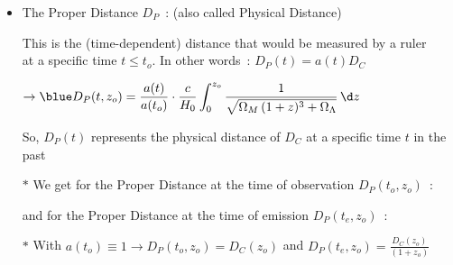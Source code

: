 \Tr
\onecolumn
\begin{itemize}
\item The {\blue Proper Distance $D_{P}$}~: (also called {\blue Physical Distance})
\item[] This is the (time-dependent) distance that would be measured by a ruler\\
        at a specific time $t \leq t_{o}$. In other words~: {\blue $D_{P}(t)=a(t)D_{C}$}
\item[] $\rightarrow \displaystyle {\blue D_{P}(t,z_{o})=\frac{a(t)}{a(t_{o})}\cdot\frac{c}{H_{0}}
         \int_{0}^{z_{o}}\frac{1}{\sqrt{\Omega_{M}\,(1+z)^{3}+\Omega_{\Lambda}}}\, \d z}$
\item[] So, $D_{P}(t)$ represents the physical distance of $D_{C}$ at a specific time $t$ in the past
\item[$\ast$] We get for the {\blue Proper Distance at the time of observation $D_{P}(t_{o},z_{o})$}~:
\item[] \begin{center}
        {\red {}}
        \end{center}
\item[] and for the {\blue Proper Distance at the time of emission $D_{P}(t_{e},z_{o})$}~:
\item[] \begin{center}
        {\red {}}
        \end{center}
\item[$\ast$] With $a(t_{o}) \equiv 1 \rightarrow
        D_{P}(t_{o},z_{o})=D_{C}(z_{o})$ and $D_{P}(t_{e},z_{o})=\frac{D_{C}(z_{o})}{(1+z_{o})}$
\end{itemize}

